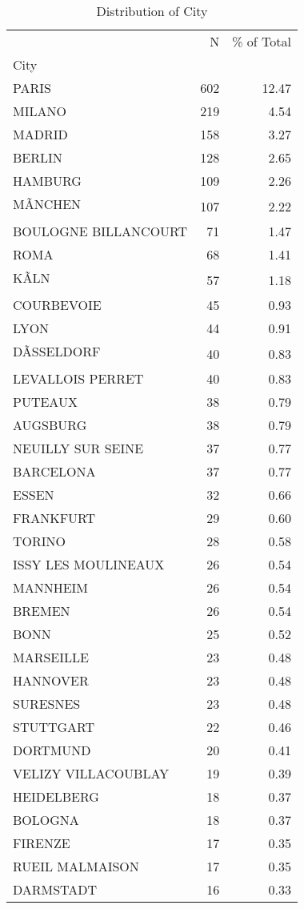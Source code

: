 \begin{table*}[htbp]
\centering
\small
\caption{Distribution of City}
\label{tab:dist_city}
\begin{tabular}{lrr}
\toprule
 & N & \% of Total \\
City &  &  \\
\midrule
PARIS & 602 & 12.47 \\
MILANO & 219 & 4.54 \\
MADRID & 158 & 3.27 \\
BERLIN & 128 & 2.65 \\
HAMBURG & 109 & 2.26 \\
MÃNCHEN & 107 & 2.22 \\
BOULOGNE BILLANCOURT & 71 & 1.47 \\
ROMA & 68 & 1.41 \\
KÃLN & 57 & 1.18 \\
COURBEVOIE & 45 & 0.93 \\
LYON & 44 & 0.91 \\
DÃSSELDORF & 40 & 0.83 \\
LEVALLOIS PERRET & 40 & 0.83 \\
PUTEAUX & 38 & 0.79 \\
AUGSBURG & 38 & 0.79 \\
NEUILLY SUR SEINE & 37 & 0.77 \\
BARCELONA & 37 & 0.77 \\
ESSEN & 32 & 0.66 \\
FRANKFURT & 29 & 0.60 \\
TORINO & 28 & 0.58 \\
ISSY LES MOULINEAUX & 26 & 0.54 \\
MANNHEIM & 26 & 0.54 \\
BREMEN & 26 & 0.54 \\
BONN & 25 & 0.52 \\
MARSEILLE & 23 & 0.48 \\
HANNOVER & 23 & 0.48 \\
SURESNES & 23 & 0.48 \\
STUTTGART & 22 & 0.46 \\
DORTMUND & 20 & 0.41 \\
VELIZY VILLACOUBLAY & 19 & 0.39 \\
HEIDELBERG & 18 & 0.37 \\
BOLOGNA & 18 & 0.37 \\
FIRENZE & 17 & 0.35 \\
RUEIL MALMAISON & 17 & 0.35 \\
DARMSTADT & 16 & 0.33 \\

\end{tabular}
\end{table*}
